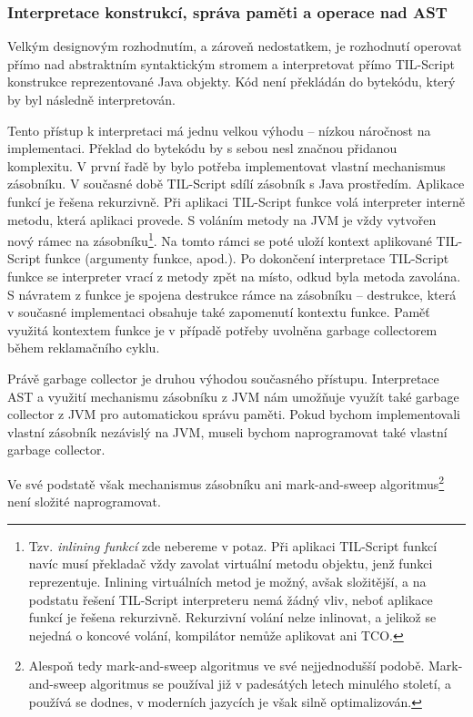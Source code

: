 \subsubsection{
  Interpretace konstrukcí, správa paměti a operace nad AST}\label{interpretation-of-constructions}

Velkým designovým rozhodnutím, a zároveň nedostatkem, je rozhodnutí operovat přímo nad abstraktním
syntaktickým stromem a interpretovat přímo TIL-Script konstrukce reprezentované Java objekty. Kód
není překládán do bytekódu, který by byl následně interpretován.

Tento přístup k interpretaci má jednu velkou výhodu -- nízkou náročnost na implementaci. Překlad
do bytekódu by s sebou nesl značnou přidanou komplexitu. V první řadě by bylo potřeba implementovat
vlastní mechanismus zásobníku. V současné době TIL-Script sdílí zásobník s Java prostředím. Aplikace
funkcí je řešena rekurzivně. Při aplikaci TIL-Script funkce volá interpreter interně metodu, která
aplikaci provede. S voláním metody na JVM je vždy vytvořen nový rámec na zásobníku\footnote{
  Tzv. \textit{inlining funkcí} zde nebereme v potaz. Při aplikaci TIL-Script funkcí navíc musí
  překladač vždy zavolat virtuální metodu objektu, jenž funkci reprezentuje. Inlining virtuálních
  metod je možný, avšak složitější, a na podstatu řešení TIL-Script interpreteru nemá žádný vliv,
  neboť aplikace funkcí je řešena rekurzivně. Rekurzivní volání nelze inlinovat, a jelikož se
  nejedná o koncové volání, kompilátor nemůže aplikovat ani TCO.
}.
Na tomto rámci se poté uloží kontext aplikované TIL-Script funkce (argumenty funkce, apod.).
Po dokončení interpretace TIL-Script funkce se interpreter vrací z metody zpět na místo, odkud byla
metoda zavolána. S návratem z funkce je spojena destrukce rámce na zásobníku -- destrukce, která
v současné implementaci obsahuje také zapomenutí kontextu funkce. Paměť využitá kontextem funkce
je v případě potřeby uvolněna garbage collectorem během reklamačního cyklu.

Právě garbage collector je druhou výhodou současného přístupu. Interpretace AST a využití mechanismu
zásobníku z JVM nám umožňuje využít také garbage collector z JVM pro automatickou správu paměti.
Pokud bychom implementovali vlastní zásobník nezávislý na JVM, museli bychom naprogramovat také
vlastní garbage collector.

Ve své podstatě však mechanismus zásobníku ani mark-and-sweep algoritmus\footnote{Alespoň tedy
  mark-and-sweep algoritmus ve své nejjednodušší podobě. Mark-and-sweep algoritmus se používal již
  v padesátých letech minulého století, a používá se dodnes, v moderních jazycích je však silně
  optimalizován.} není složité naprogramovat.

